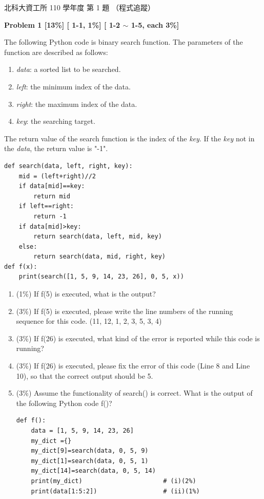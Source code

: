 \begin{pastexam}[label={px:ntut-110-prog-01}]{北科大資工所 110 學年度 第 1 題}
（程式追蹤）

\textbf{Problem 1 [13\%] [ 1-1, 1\%] [ 1-2 $\sim$ 1-5, each 3\%]}

The following Python code is binary search function. The parameters of the function are described
as follows:
\begin{enumerate}[label=(\alph*),nosep]
\item \textit{data}: a sorted list to be searched.
\item \textit{left}: the minimum index of the data.
\item \textit{right}: the maximum index of the data.
\item \textit{key}: the searching target.
\end{enumerate}
The return value of the search function is the index of the \textit{key}. If the \textit{key} not in
the \textit{data}, the return value is "-1".
\begin{verbatim}
def search(data, left, right, key):
    mid = (left+right)//2
    if data[mid]==key:
        return mid
    if left==right:
        return -1
    if data[mid]>key:
        return search(data, left, mid, key)
    else:
        return search(data, mid, right, key)
def f(x):
    print(search([1, 5, 9, 14, 23, 26], 0, 5, x))
\end{verbatim}
\begin{enumerate}[label=(\arabic*)]
\item (1\%) If f(5) is executed, what is the output?
\item (3\%) If f(5) is executed, please write the line numbers of the running sequence for this
code. (11, 12, 1, 2, 3, 5, \underline{\hspace{3em}}3, 4)
\item (3\%) If f(26) is executed, what kind of the error is reported while this code is running?
\item (3\%) If f(26) is executed, please fix the error of this code (Line 8 and Line 10), so that the
correct output should be 5.
\item (3\%) Assume the functionality of search() is correct. What is the output of the following
Python code f()?
\begin{verbatim}
def f():
    data = [1, 5, 9, 14, 23, 26]
    my_dict ={}
    my_dict[9]=search(data, 0, 5, 9)
    my_dict[1]=search(data, 0, 5, 1)
    my_dict[14]=search(data, 0, 5, 14)
    print(my_dict)                      # (i)(2%)
    print(data[1:5:2])                  # (ii)(1%)
\end{verbatim}
\end{enumerate}
\end{pastexam}

